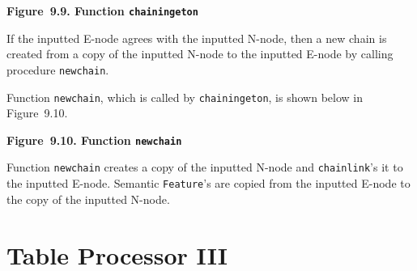 \documentclass{article}
\begin{document}
\bigbreak
\begin{minipage}{\textwidth}
\vbox{}
\bigbreak
{}
\textbf{Figure~9.9. Function \texttt{chainingeton}}
\end{minipage}
\bigbreak

If the inputted E-node agrees with the inputted N-node, then a
new chain is created from a copy of the inputted N-node to the
inputted E-node by calling procedure \texttt{newchain}.

Function \texttt{newchain}, which is called by
\texttt{chainingeton}, is shown below in Figure~9.10.

\bigbreak
\begin{minipage}{\textwidth}
\vbox{}
\bigbreak
{}
\textbf{Figure~9.10. Function \texttt{newchain}}
\end{minipage}
\bigbreak

Function \texttt{newchain} creates a copy of the inputted
N-node and \texttt{chainlink}'s it to the inputted
E-node. Semantic \texttt{Feature}'s are copied from the inputted
E-node to the copy of the inputted N-node.

%
%

\section{Table Processor III}
\end{document}
